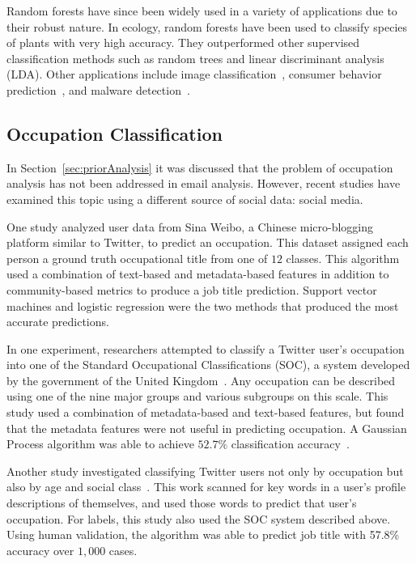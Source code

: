 \documentclass[12pt]{report}
\begin{document}
Random forests have since been widely used in a variety of applications due to their robust nature.
In ecology, random forests have been used to classify species of plants with very high accuracy.
They outperformed other supervised classification methods such as random trees and linear discriminant analysis (LDA)\cite{cutler2007random}.
Other applications include image classification~\cite{marin2013random}, consumer behavior prediction~\cite{lariviere2005predicting}, and malware detection~\cite{sami2010malware}. 

\subsection{Occupation Classification}
In Section~\ref{sec:priorAnalysis} it was discussed that the problem of occupation analysis has not been addressed in email analysis.
However, recent studies have examined this topic using a different source of social data: social media.

One study analyzed user data from Sina Weibo, a Chinese  micro-blogging platform similar to Twitter, to predict an occupation\cite{huang2015multi}.
This dataset assigned each person a ground truth occupational title from one of $12$ classes.
This algorithm used a combination of text-based and metadata-based features in addition to community-based metrics to produce a job title prediction.
Support vector machines and logistic regression were the two methods that produced the most accurate predictions.  

In one experiment, researchers attempted to classify a Twitter user's occupation into one of the Standard Occupational Classifications (SOC), a system developed by the government of the United Kingdom~\cite{SOC}.
Any occupation can be described using one of the nine major groups and various subgroups on this scale.
This study used a combination of metadata-based and text-based features, but found that the metadata features were not useful in predicting occupation.
A Gaussian Process algorithm was able to achieve $52.7\%$ classification accuracy~\cite{preoctiuc2015analysis}.

Another study investigated classifying Twitter users not only by occupation but also by age and social class~\cite{sloan2015tweets}.
This work scanned for key words in a user's profile descriptions of themselves, and used those words to predict that user's occupation. 
For labels, this study also used the SOC system described above.
Using human validation, the algorithm was able to predict job title with 57.8\% accuracy over $1,000$ cases.
\end{document}
